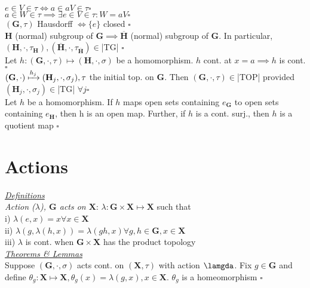 $e\in V\in\tau\iff a\in aV\in\tau \square$\\
$a\in W\in\tau\implies\exists e\in V\in\tau:W=aV \square$\\
$(\mathbf{G},\tau)$ Hausdorff $\iff\{e\}$ closed $\square$\\
$\mathbf{H}$ (normal) subgroup of $\mathbf{G}\implies\overline{\mathbf{H}}$ (normal) subgroup of $\mathbf{G}.$ In particular, $(\mathbf{H},\cdot,\tau_\mathbf{H}),(\overline{\mathbf{H}},\cdot,\tau_{\overline{\mathbf{H}}})\in$|TG| $\square$\\
Let $h:(\mathbf{G},\cdot,\tau)\mapsto(\mathbf{H},\cdot,\sigma)$ be a homomorphism. $h$ cont. at $x=a\implies h$ is cont. $\square$\\
$(\mathbf{G},\cdot)\xmapsto{h_j}(\mathbf{H}_j,\cdot,\sigma_j),\tau$ the initial top. on $\mathbf{G}$. Then $(\mathbf{G},\cdot,\tau)\in$|TOP| provided $(\mathbf{H}_j,\cdot,\sigma_j)\in$|TG| $\forall j\square$\\
Let $h$ be a homomorphism. If $h$ maps open sets containing $e_\mathbf{G}$ to open sets containing $e_\mathbf{H}$, then h is an open map. Further, if $h$ is a cont. surj., then $h$ is a quotient map $\square$
\section{Actions}
\underline{\emph{Definitions}}\\
\emph{Action ($\lambda$), $\mathbf{G}$ acts on $\mathbf{X}$}: $\lambda:\mathbf{G}\times\mathbf{X}\mapsto\mathbf{X}$ such that\\
i) $\lambda(e,x)=x \forall x\in\mathbf{X}$\\
ii) $\lambda(g,\lambda(h,x))=\lambda(gh,x)\forall g,h\in\mathbf{G},x\in\mathbf{X}$\\
iii) $\lambda$ is cont. when $\mathbf{G}\times\mathbf{X}$ has the product topology
\\\underline{\emph{Theorems \& Lemmas}}\\
Suppose $(\mathbf{G},\cdot,\sigma)$ acts cont. on $(\mathbf{X},\tau)$ with action $\lamgda$. Fix $g\in\mathbf{G}$ and define $\theta_g:\mathbf{X}\mapsto\mathbf{X}, \theta_g(x)=\lambda(g,x),x\in\mathbf{X}$. $\theta_g$ is a homeomorphism $\square$
